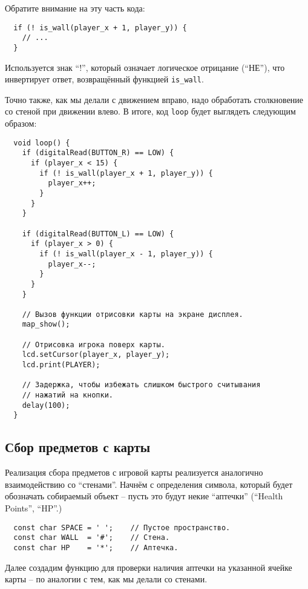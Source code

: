 \documentclass[../sparc.tex]{subfiles}
\begin{document}
Обратите внимание на эту часть кода:

\begin{verbatim}
  if (! is_wall(player_x + 1, player_y)) {
    // ...
  }
\end{verbatim}

Используется знак ``!'', который означает логическое отрицание (``НЕ''), что
инвертирует ответ, возвращённый функцией \texttt{is\_wall}.

Точно также, как мы делали с движением вправо, надо обработать столкновение со
стеной при движении влево.  В итоге, код \texttt{loop} будет выглядеть следующим
образом:

\begin{verbatim}
  void loop() {
    if (digitalRead(BUTTON_R) == LOW) {
      if (player_x < 15) {
        if (! is_wall(player_x + 1, player_y)) {
          player_x++;
        }
      }
    }

    if (digitalRead(BUTTON_L) == LOW) {
      if (player_x > 0) {
        if (! is_wall(player_x - 1, player_y)) {
          player_x--;
        }
      }
    }

    // Вызов функции отрисовки карты на экране дисплея.
    map_show();

    // Отрисовка игрока поверх карты.
    lcd.setCursor(player_x, player_y);
    lcd.print(PLAYER);

    // Задержка, чтобы избежать слишком быстрого считывания
    // нажатий на кнопки.
    delay(100);
  }
\end{verbatim}

\subsection{Сбор предметов с карты}

Реализация сбора предметов с игровой карты реализуется аналогично взаимодействию
со ``стенами''.  Начнём с определения символа, который будет обозначать
собираемый объект -- пусть это будут некие ``аптечки'' (``Health Points'',
``HP''.)

\begin{verbatim}
  const char SPACE = ' ';    // Пустое пространство.
  const char WALL  = '#';    // Стена.
  const char HP    = '*';    // Аптечка.
\end{verbatim}

Далее создадим функцию для проверки наличия аптечки на указанной ячейке карты --
по аналогии с тем, как мы делали со стенами.
\end{document}
